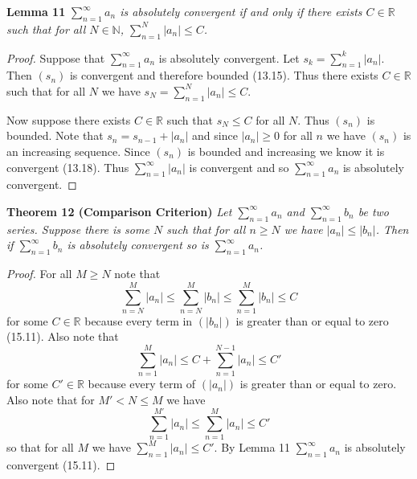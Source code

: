 \documentclass{article}
\begin{document}
\begin{flushleft}
\textbf{Lemma 11}
\textsl{$\sum_{n=1}^{\infty} a_n$ is absolutely convergent if and only if there exists $C \in \mathbb{R}$ such that for all $N \in \mathbb{N}$, $\sum_{n=1}^{N} |a_n| \leq C$.}
\begin{proof}
Suppose that $\sum_{n=1}^{\infty} a_n$ is absolutely convergent. Let $s_k = \sum_{n=1}^{k} |a_n|$. Then $(s_n)$ is convergent and therefore bounded (13.15). Thus there exists $C \in \mathbb{R}$ such that for all $N$ we have $s_N = \sum_{n=1}^{N} |a_n| \leq C$.\newline

Now suppose there exists $C \in \mathbb{R}$ such that $s_N \leq C$ for all $N$. Thus $(s_n)$ is bounded. Note that $s_n = s_{n-1} + |a_n|$ and since $|a_n| \geq 0$ for all $n$ we have $(s_n)$ is an increasing sequence. Since $(s_n)$ is bounded and increasing we know it is convergent (13.18). Thus $\sum_{n=1}^{\infty} |a_n|$ is convergent and so $\sum_{n=1}^{\infty} a_n$ is absolutely convergent.
\end{proof}

\textbf{Theorem 12 (Comparison Criterion)}
\textsl{Let $\sum_{n=1}^{\infty} a_n$ and $\sum_{n=1}^{\infty} b_n$ be two series. Suppose there is some $N$ such that for all $n \geq N$ we have $|a_n| \leq |b_n|$. Then if $\sum_{n=1}^{\infty} b_n$ is absolutely convergent so is $\sum_{n=1}^{\infty} a_n$.}
\begin{proof}
For all $M \geq N$ note that
\[
\sum_{n=N}^{M} |a_n| \leq \sum_{n=N}^{M} |b_n| \leq \sum_{n=1}^{M} |b_n| \leq C
\]
for some $C \in \mathbb{R}$ because every term in $(|b_n|)$ is greater than or equal to zero (15.11). Also note that
\[
\sum_{n=1}^{M} |a_n| \leq C + \sum_{n=1}^{N-1} |a_n| \leq C'
\]
for some $C' \in \mathbb{R}$ because every term of $(|a_n|)$ is greater than or equal to zero. Also note that for $M' < N \leq M$ we have
\[
\sum_{n=1}^{M'} |a_n| \leq \sum_{n=1}^{M} |a_n| \leq C'
\]
so that for all $M$ we have $\sum_{n=1}^{M} |a_n| \leq C'$. By Lemma 11 $\sum_{n=1}^{\infty} a_n$ is absolutely convergent (15.11).
\end{proof}


\end{flushleft}
\end{document}
